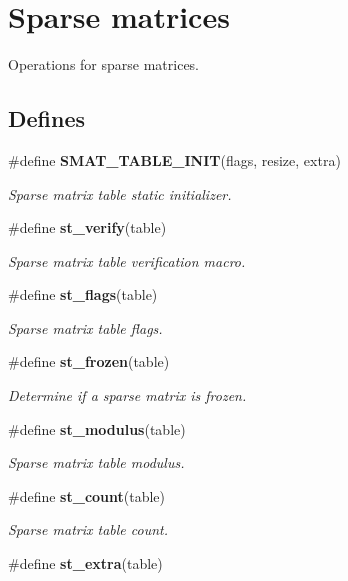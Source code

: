 \section{Sparse matrices}
\label{group__dbprim__smat}
Operations for sparse matrices. 
\subsection*{Defines}
\begin{CompactItemize}
\item 
\#define {\bf SMAT\_\-TABLE\_\-INIT}(flags, resize, extra)
\begin{CompactList}\small\item\em Sparse matrix table static initializer.\item\end{CompactList}\item 
\#define {\bf st\_\-verify}(table)
\begin{CompactList}\small\item\em Sparse matrix table verification macro.\item\end{CompactList}\item 
\#define {\bf st\_\-flags}(table)
\begin{CompactList}\small\item\em Sparse matrix table flags.\item\end{CompactList}\item 
\#define {\bf st\_\-frozen}(table)
\begin{CompactList}\small\item\em Determine if a sparse matrix is frozen.\item\end{CompactList}\item 
\#define {\bf st\_\-modulus}(table)
\begin{CompactList}\small\item\em Sparse matrix table modulus.\item\end{CompactList}\item 
\#define {\bf st\_\-count}(table)
\begin{CompactList}\small\item\em Sparse matrix table count.\item\end{CompactList}\item 
\#define {\bf st\_\-extra}(table)

\end{CompactItemize}
